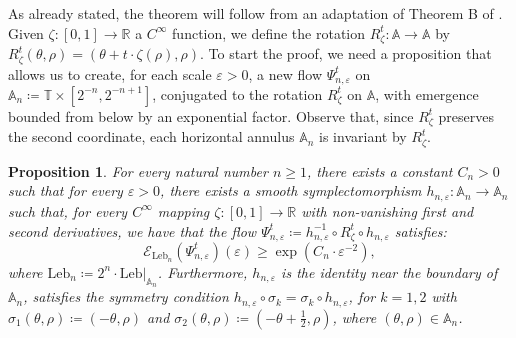 \documentclass[11pt,reqno]{amsart}
\theoremstyle{plain}
\newtheorem{prop}[theorem]{Proposition}
\theoremstyle{definition}
\theoremstyle{remark}
\theoremstyle{plain}
\numberwithin{equation}{section}
\newcommand{\R}{\mathbb{R}}
\newcommand{\T}{\mathbb{T}}
\newcommand{\A}{\mathbb{A}}
\newcommand{\restr}[2]{#1|_{#2}}
\newcommand{\eps}{\varepsilon}
\begin{document}
As already stated, the theorem will follow from an adaptation of Theorem B of \cite{bergerbochi}. Given $ \zeta\colon [0,1]\to \R$ a $C^{\infty}$ function, we define the rotation $R^{t}_{\zeta}\colon \mathbb{A}\to \mathbb{A}$ by $R_{ \zeta}^{t}(\theta,\rho)=(\theta+t\cdot  \zeta(\rho),\rho)$. To start the proof, we need a proposition that allows us to create, for each scale $\eps>0$, a new flow $\Psi^{t}_{n,\eps}$ on $\mathbb{A}_{n}\coloneqq \T \times [2^{-n},2^{-n+1}]$, conjugated to the rotation $R^{t}_{ \zeta}$ on $\mathbb{A}$, with emergence bounded from below by an exponential factor. Observe that, since \(R_\zeta^t\) preserves the second coordinate, each horizontal annulus $\mathbb{A}_n$ is invariant by \(R_\zeta^t\). 

\begin{prop}\label{emergencia em cada escala}
	For every natural number $n\geq 1$, there exists a constant $C_{n}>0$ such that for every $\eps>0$, there exists a smooth symplectomorphism $h_{n,\eps}\colon \mathbb{A}_{n}\to \mathbb{A}_{n}$ such that, for every $C^{\infty}$ mapping $ \zeta\colon [0,1]\to \R$ with non-vanishing first and second derivatives, we have that the flow $\Psi^{t}_{n,\eps}\coloneqq h^{-1}_{n,\eps}\circ R^{t}_{ \zeta}\circ h_{n,\eps}$ satisfies: $$\mathcal{E}_{\mathrm{Leb}_{n}}(\Psi^{t}_{n,\eps})(\eps)\geq \exp(C_{n}\cdot \eps^{-2}),$$ where $\mathrm{Leb}_{n}\coloneqq 2^{n}\cdot \restr{\mathrm{Leb}}{\A_{n}}$. Furthermore, $h_{n,\eps}$ is the identity near the boundary of $\mathbb{A}_{n}$, satisfies the symmetry condition $h_{n,\eps}\circ \sigma_{k}=\sigma_{k}\circ h_{n,\eps}$, for $k=1,2$ with $\sigma_{1}(\theta,\rho)\coloneqq \left(-\theta,\rho\right)$ and $\sigma_{2}(\theta,\rho)\coloneqq \left(-\theta+\frac12,\rho\right)$, where $(\theta, \rho)\in \mathbb{A}_{n}$.

	\end{prop}
\end{document}
